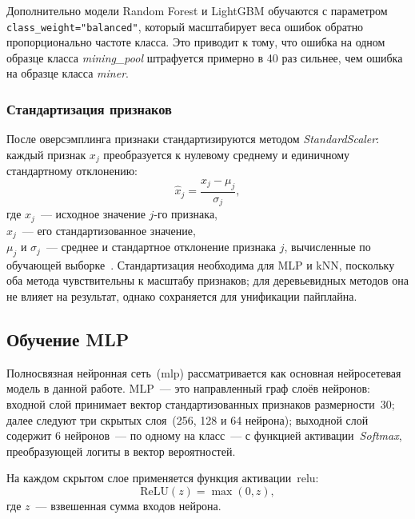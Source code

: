 Дополнительно модели Random Forest и LightGBM обучаются с параметром \texttt{class\_weight="balanced"}, который масштабирует веса ошибок обратно пропорционально частоте класса. Это приводит к тому, что ошибка на одном образце класса \textit{mining\_pool} штрафуется примерно в 40 раз сильнее, чем ошибка на образце класса \textit{miner}.

\subsubsection{Стандартизация признаков}

После оверсэмплинга признаки стандартизируются методом \textit{StandardScaler}: каждый признак $x_j$ преобразуется к нулевому среднему и единичному стандартному отклонению:
\begin{equation}\label{eq:standardscaler}
    \hat{x}_j = \frac{x_j - \mu_j}{\sigma_j},
\end{equation}
где $x_j$~--- исходное значение $j$-го признака, \\ $\hat{x}_j$~--- его стандартизованное значение, \\ $\mu_j$ и $\sigma_j$~--- среднее и стандартное отклонение признака $j$, вычисленные по обучающей выборке~\cite{scikit_learn}. Стандартизация необходима для MLP и kNN, поскольку оба метода чувствительны к масштабу признаков; для деревьевидных методов она не влияет на результат, однако сохраняется для унификации пайплайна.

\subsection{Обучение MLP}

Полносвязная нейронная сеть~(\acrshort{mlp}) рассматривается как основная нейросетевая модель в данной работе. MLP~--- это направленный граф слоёв нейронов: входной слой принимает вектор стандартизованных признаков размерности~30; далее следуют три скрытых слоя~(256, 128 и 64 нейрона); выходной слой содержит 6 нейронов~--- по одному на класс~--- с функцией активации~\textit{Softmax}, преобразующей логиты в вектор вероятностей.

На каждом скрытом слое применяется функция активации~\acrshort{relu}:
\begin{equation}\label{eq:relu}
    \text{ReLU}(z) = \max(0, z),
\end{equation}
где $z$~--- взвешенная сумма входов нейрона.

